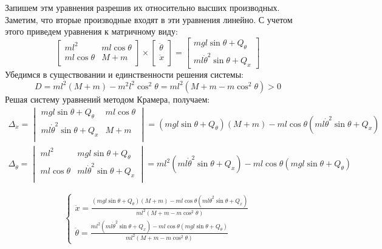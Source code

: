 Запишем этм уравнения разрешив их относительно высших производных. Заметим, что вторые производные 
входят в эти уравнения линейно. С учетом этого приведем уравнения к матричному виду:  %
\begin{equation}
    \begin{bmatrix}
        ml^2 & ml\cos\theta \\
        ml\cos\theta & M + m \\
    \end{bmatrix} \times
    \begin{bmatrix}
        \ddot{\theta} \\
        \ddot{x} \\
    \end{bmatrix} =
    \begin{bmatrix}
        mgl\sin\theta + Q_{\theta} \\
        ml\dot{\theta}^2\sin\theta + Q_x
    \end{bmatrix}
\end{equation}
Убедимся в существовании и единственности решения системы:
\begin{equation}
    D = ml^2(M + m) - m^2l^2\cos^2\theta = ml^2(M + m - m\cos^2\theta) > 0
\end{equation}
Решая систему уравнений методом Крамера, получаем:
\begin{multline}
    \Delta_{\ddot{x}} = \begin{vmatrix}
        mgl\sin\theta + Q_{\theta} & ml\cos\theta \\
        ml\dot{\theta}^2\sin\theta + Q_x & M + m \\
    \end{vmatrix} = (mgl\sin\theta + Q_{\theta})(M + m) - ml\cos\theta(ml\dot{\theta}^2\sin\theta + Q_x) 
\end{multline}
\begin{multline}
    \Delta_{\ddot{\theta}} = \begin{vmatrix}
        ml^2 & mgl\sin\theta + Q_{\theta} \\
        ml\cos\theta & ml\dot{\theta}^2\sin\theta + Q_x \\
    \end{vmatrix} = ml^2(ml\dot{\theta}^2\sin\theta + Q_x) - ml\cos\theta(mgl\sin\theta + Q_{\theta})
\end{multline}

\begin{equation}
    \begin{cases}
        \ddot{x} = \frac{(mgl\sin\theta + Q_{\theta})(M + m) - ml\cos\theta(ml\dot{\theta}^2\sin\theta + Q_x)}{ml^2(M + m - m\cos^2\theta)} \\ 
        \ddot{\theta} = \frac{ml^2(ml\dot{\theta}^2\sin\theta + Q_x) - ml\cos\theta(mgl\sin\theta + Q_{\theta})}{ml^2(M + m - m\cos^2\theta)}
    \end{cases}
\end{equation}

